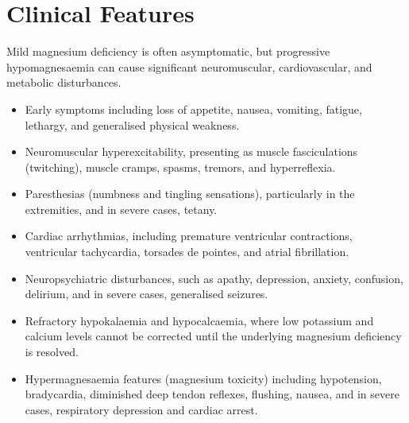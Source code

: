 \section*{Clinical Features}
Mild magnesium deficiency is often asymptomatic, but progressive hypomagnesaemia can cause significant neuromuscular, cardiovascular, and metabolic disturbances.
\begin{itemize}
    \item Early symptoms including loss of appetite, nausea, vomiting, fatigue, lethargy, and generalised physical weakness.
    \item Neuromuscular hyperexcitability, presenting as muscle fasciculations (twitching), muscle cramps, spasms, tremors, and hyperreflexia.
    \item Paresthesias (numbness and tingling sensations), particularly in the extremities, and in severe cases, tetany.
    \item Cardiac arrhythmias, including premature ventricular contractions, ventricular tachycardia, torsades de pointes, and atrial fibrillation.
    \item Neuropsychiatric disturbances, such as apathy, depression, anxiety, confusion, delirium, and in severe cases, generalised seizures.
    \item Refractory hypokalaemia and hypocalcaemia, where low potassium and calcium levels cannot be corrected until the underlying magnesium deficiency is resolved.
    \item Hypermagnesaemia features (magnesium toxicity) including hypotension, bradycardia, diminished deep tendon reflexes, flushing, nausea, and in severe cases, respiratory depression and cardiac arrest.
\end{itemize}

